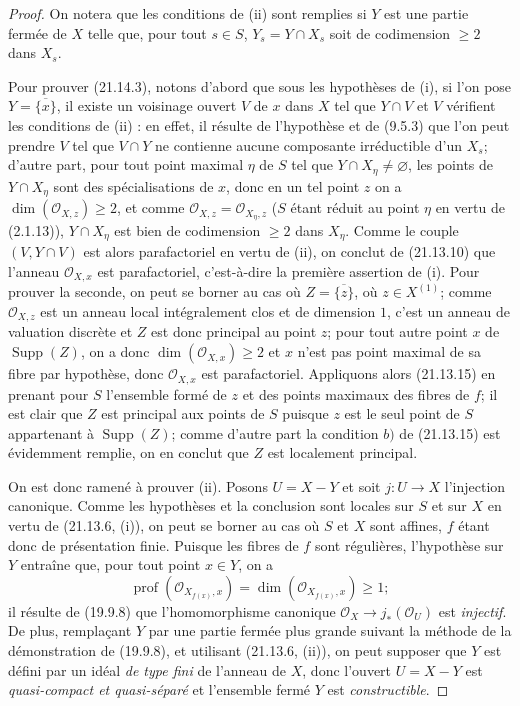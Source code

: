 \begin{proof}
On notera que les conditions de (ii) sont remplies si $Y$ est une partie fermée de $X$
telle que, pour tout $s\in S$, $Y_s=Y\cap X_s$ soit de codimension $\geq2$ dans
$X_s$.

Pour prouver (21.14.3), notons d'abord que sous les hypothèses de (i), si l'on pose
$Y=\overline{\{x\}}$, il existe un voisinage ouvert $V$ de $x$ dans $X$ tel que
$Y\cap V$ et $V$ vérifient les conditions de (ii) : en effet, il résulte de l'hypothèse
et de (9.5.3) que l'on peut prendre $V$ tel que $V\cap Y$ ne contienne aucune
composante irréductible d'un $X_s$; d'autre part, pour tout point maximal $\eta$ de
$S$ tel que $Y\cap X_\eta\neq\varnothing$, les points de $Y\cap X_\eta$ sont des
spécialisations de $x$, donc en un tel point $z$ on a
$\dim(\mathcal O_{X,z})\geq2$, et comme
$\mathcal O_{X,z}=\mathcal O_{X_\eta,z}$ ($S$ étant réduit au point $\eta$ en vertu
de (2.1.13)), $Y\cap X_\eta$ est bien de codimension $\geq2$ dans $X_\eta$. Comme le
couple $(V,Y\cap V)$ est alors parafactoriel en vertu de (ii), on conclut de (21.13.10)
que l'anneau $\mathcal O_{X,x}$ est parafactoriel, c'est-à-dire la première assertion
de (i). Pour prouver la seconde, on peut se borner au cas où
$Z=\overline{\{z\}}$, où $z\in X^{(1)}$; comme $\mathcal O_{X,z}$ est un anneau local
intégralement clos et de dimension $1$, c'est un anneau de valuation discrète et $Z$
est donc principal au point $z$; pour tout autre point $x$ de
$\operatorname{Supp}(Z)$, on a donc $\dim(\mathcal O_{X,x})\geq2$ et $x$ n'est pas
point maximal de sa fibre par hypothèse, donc $\mathcal O_{X,x}$ est parafactoriel.
Appliquons alors (21.13.15) en prenant pour $S$ l'ensemble formé de $z$ et des points
maximaux des fibres de $f$; il est clair que $Z$ est principal aux points de $S$
puisque $z$ est le seul point de $S$ appartenant à $\operatorname{Supp}(Z)$; comme
d'autre part la condition $b)$ de (21.13.15) est évidemment remplie, on en conclut que
$Z$ est localement principal.

On est donc ramené à prouver (ii). Posons $U=X-Y$ et soit $j:U\to X$ l'injection
canonique.
Comme les hypothèses et la conclusion sont locales sur $S$ et sur $X$ en vertu de
(21.13.6, (i)), on peut se borner au cas où $S$ et $X$ sont affines, $f$ étant donc de
présentation finie. Puisque les fibres de $f$ sont régulières, l'hypothèse sur $Y$
entraîne que, pour tout point $x\in Y$, on a
\[
  \operatorname{prof}(\mathcal O_{X_{f(x)},x})
  =\dim(\mathcal O_{X_{f(x)},x})\geq1;
\]
il résulte de (19.9.8) que l'homomorphisme canonique
$\mathcal O_X\to j_*(\mathcal O_U)$ est \emph{injectif}. De plus, remplaçant $Y$ par
une partie fermée plus grande suivant la méthode de la démonstration de (19.9.8), et
utilisant (21.13.6, (ii)), on peut supposer que $Y$ est défini par un idéal \emph{de
type fini} de l'anneau de $X$, donc l'ouvert $U=X-Y$ est \emph{quasi-compact et
quasi-séparé} et l'ensemble fermé $Y$ est \emph{constructible}.


\end{proof}
